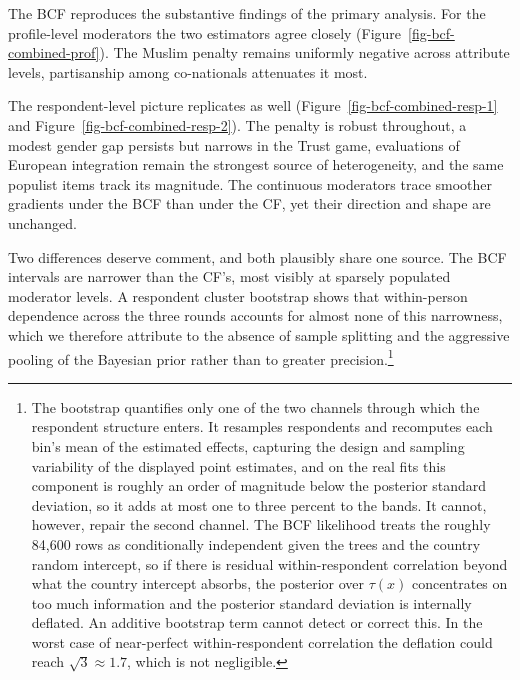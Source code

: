 \documentclass[
  10pt,
  a4paper,
  DIV=11,
  numbers=noendperiod]{scrartcl}
\newcounter{none} %
\begin{document}
The BCF reproduces the substantive findings of the primary analysis. For
the profile-level moderators the two estimators agree closely
(Figure~\ref{fig-bcf-combined-prof}). The Muslim penalty remains
uniformly negative across attribute levels, partisanship among
co-nationals attenuates it most.

The respondent-level picture replicates as well
(Figure~\ref{fig-bcf-combined-resp-1} and
Figure~\ref{fig-bcf-combined-resp-2}). The penalty is robust throughout,
a modest gender gap persists but narrows in the Trust game, evaluations
of European integration remain the strongest source of heterogeneity,
and the same populist items track its magnitude. The continuous
moderators trace smoother gradients under the BCF than under the CF, yet
their direction and shape are unchanged.

Two differences deserve comment, and both plausibly share one source.
The BCF intervals are narrower than the CF's, most visibly at sparsely
populated moderator levels. A respondent cluster bootstrap shows that
within-person dependence across the three rounds accounts for almost
none of this narrowness, which we therefore attribute to the absence of
sample splitting and the aggressive pooling of the Bayesian prior rather
than to greater precision.\footnote{The bootstrap quantifies only one of
  the two channels through which the respondent structure enters. It
  resamples respondents and recomputes each bin's mean of the estimated
  effects, capturing the design and sampling variability of the
  displayed point estimates, and on the real fits this component is
  roughly an order of magnitude below the posterior standard deviation,
  so it adds at most one to three percent to the bands. It cannot,
  however, repair the second channel. The BCF likelihood treats the
  roughly 84,600 rows as conditionally independent given the trees and
  the country random intercept, so if there is residual
  within-respondent correlation beyond what the country intercept
  absorbs, the posterior over \(\tau(x)\) concentrates on too much
  information and the posterior standard deviation is internally
  deflated. An additive bootstrap term cannot detect or correct this. In
  the worst case of near-perfect within-respondent correlation the
  deflation could reach \(\sqrt{3} \approx 1.7\), which is not
  negligible.}
\end{document}

